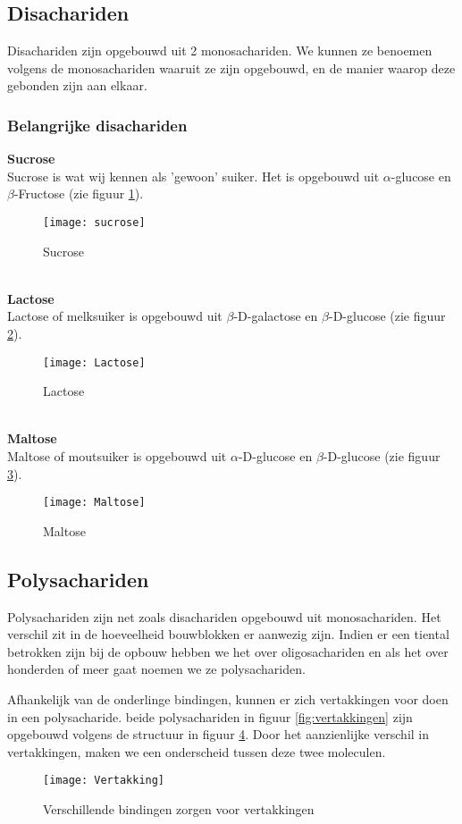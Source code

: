 \documentclass[a4paper,kul]{kulakarticle} %
\begin{document}
\subsection{Disachariden}
Disachariden zijn opgebouwd uit 2 monosachariden. We kunnen ze benoemen volgens de monosachariden waaruit ze zijn opgebouwd, en de manier waarop deze gebonden zijn aan elkaar.
\subsubsection{Belangrijke disachariden}
\textbf{Sucrose}\\
Sucrose is wat wij kennen als 'gewoon' suiker. Het is opgebouwd uit $\alpha$-glucose en $\beta$-Fructose (zie figuur \ref{fig:sucrose}).
\begin{figure}[h]
	\centering
	\texttt{[image: sucrose]}
	\caption[Sucrose]{Sucrose}
	\label{fig:sucrose}
\end{figure}\\
\textbf{Lactose}\\
Lactose of melksuiker is opgebouwd uit $\beta$-D-galactose en $\beta$-D-glucose (zie figuur \ref{fig:lactose}).
\begin{figure}[h]
	\centering
	\texttt{[image: Lactose]}
	\caption[Lactose]{Lactose}
	\label{fig:lactose}
\end{figure}\\ 
\newpage 	
\textbf{Maltose}\\
Maltose of moutsuiker is opgebouwd uit $\alpha$-D-glucose en $\beta$-D-glucose (zie figuur \ref{fig:maltose}).
\begin{figure}[h]
	\centering
	\texttt{[image: Maltose]}
	\caption[Maltose]{Maltose}
	\label{fig:maltose}
\end{figure}

\subsection{Polysachariden}
Polysachariden zijn net zoals disachariden opgebouwd uit monosachariden. Het verschil zit in de hoeveelheid bouwblokken er aanwezig zijn. Indien er een tiental betrokken zijn bij de opbouw hebben we het over oligosachariden en als het over honderden of meer gaat noemen we ze polysachariden.

Afhankelijk van de onderlinge bindingen, kunnen er zich vertakkingen voor doen in een polysacharide. beide polysachariden in figuur \ref{fig:vertakkingen} zijn opgebouwd volgens de structuur in figuur \ref{fig:vertakking}. Door het aanzienlijke verschil in vertakkingen, maken we een onderscheid tussen deze twee moleculen.
\begin{figure}[h]
	\centering
	\texttt{[image: Vertakking]}
	\caption[Vertakking]{Verschillende bindingen zorgen voor vertakkingen}
	\label{fig:vertakking}
\end{figure}
\end{document}
